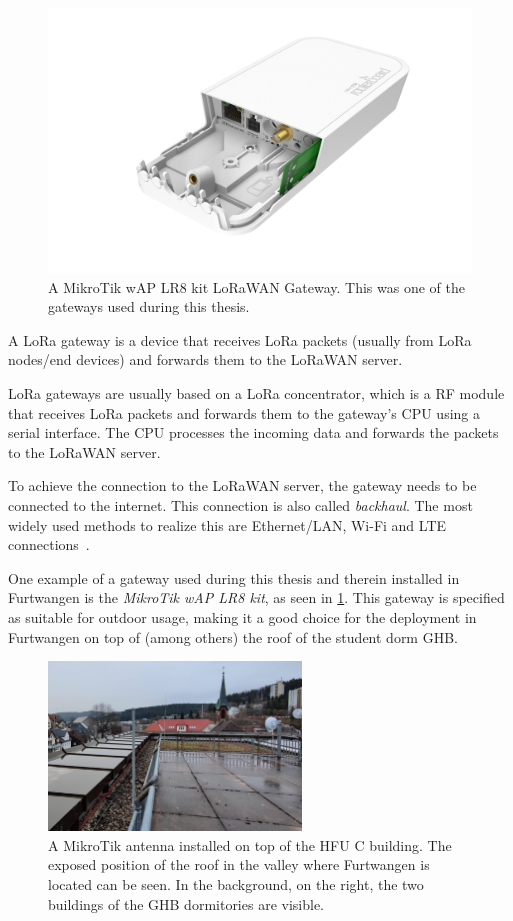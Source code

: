 \begin{figure}[htbp]
    \centering
    \includegraphics[width=.6\textwidth]{pictures/hardware/gateways/mikrotik-lr8-kit.png}
    \caption{
        A MikroTik wAP LR8 kit \ac{LoRaWAN} Gateway.
        This was one of the gateways used during this thesis.~\protect\cite{the_things_industries_bv_lorawan_nodate}
    }\label{pic:mikrotik-lr8-kit-gateway}
\end{figure}

A \ac{LoRa} gateway is a device that receives \ac{LoRa} packets (usually from \ac{LoRa} nodes/end devices) and forwards them to the \ac{LoRaWAN} server.

\ac{LoRa} gateways are usually based on a \ac{LoRa} concentrator, which is a \ac{RF} module that receives \ac{LoRa} packets and forwards them to the gateway's \ac{CPU} using a serial interface.
The \ac{CPU} processes the incoming data and forwards the packets to the \ac{LoRaWAN} server.

To achieve the connection to the \ac{LoRaWAN} server, the gateway needs to be connected to the internet.
This connection is also called \emph{backhaul}.
The most widely used methods to realize this are Ethernet/\ac{LAN}, Wi-Fi and \ac{LTE} connections~\cite{the_things_industries_bv_lorawan_nodate}.

One example of a gateway used during this thesis and therein installed in Furtwangen is the \emph{MikroTik wAP LR8 kit}, as seen in \cref{pic:mikrotik-lr8-kit-gateway}.
This gateway is specified as suitable for outdoor usage, making it a good choice for the deployment in Furtwangen on top of (among others) the roof of the student dorm \ac{GHB}.

\begin{figure}[htbp]
    \centering
    \includegraphics[width=0.6\textwidth]{pictures/hardware/gateway-deployment/mikrotik-antenna-c-building.jpg}
    \caption{
        A MikroTik antenna installed on top of the \ac{HFU} C building.
        The exposed position of the roof in the valley where Furtwangen is located can be seen.
        In the background, on the right, the two buildings of the \ac{GHB} dormitories are visible.
    }\label{pic:mikrotik-antenna-c-building}
\end{figure}

